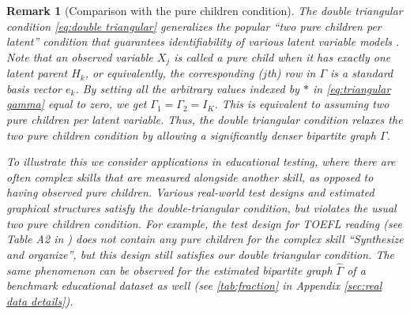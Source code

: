\documentclass[10pt]{article} %
\newtheorem{remark}{Remark}
\def\hat{\widehat}
\begin{document}
\begin{remark}[Comparison with the pure children condition]
    The double triangular condition \eqref{eq:double triangular} generalizes the popular ``two pure children per latent'' condition that guarantees identifiability of various latent variable models \citep{xie2022identification,chen2022identification,lee2025deep}. Note that an observed variable $X_j$ is called a \emph{pure child} when it has exactly one latent parent $H_k$, or equivalently, the corresponding ($j$th) row in $\Gamma$ is a standard basis vector $e_k$. By setting all the arbitrary values indexed by $*$ in \eqref{eq:triangular gamma} equal to zero, we get $\Gamma_1 = \Gamma_2 = I_K$. This is equivalent to assuming two pure children per latent variable. Thus, the double triangular condition relaxes the two pure children condition by allowing a significantly denser bipartite graph $\Gamma$.


%
%
%
%
%
%
%
 
%
%
%
%
%
%
{To illustrate this we consider applications in educational testing, where there are often complex skills that are measured alongside another skill, as opposed to having observed pure children. Various real-world test designs and estimated graphical structures satisfy the double-triangular condition, but violates the usual two pure children condition. For example, the test design for TOEFL reading (see Table A2 in \cite{von2008general}) does not contain any pure children for the complex skill “Synthesize and organize”, but this design still satisfies our double triangular condition. The same phenomenon can be observed for the estimated bipartite graph $\hat{\Gamma}$ of a benchmark educational dataset as well (see \cref{tab:fraction} in Appendix \ref{sec:real data details}).}
\end{remark}
\end{document}
